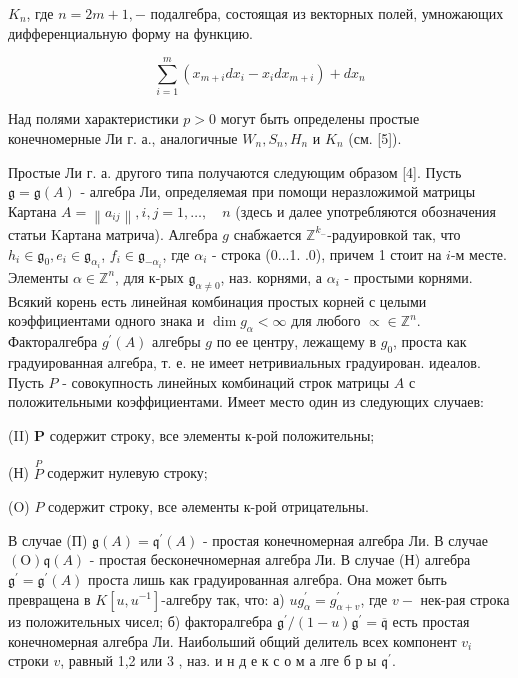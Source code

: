 \documentclass[10pt]{article}
\begin{document}
$K_{n}$, где $n=2 m+1,-$ подалгебра, состоящая из векторных полей, умножающих дифференциальную форму на функцию.



\[

\sum_{i=1}^{m}\left(x_{m+i} d x_{i}-x_{i} d x_{m+i}\right)+d x_{n}

\]



Над полями характеристики $p>0$ могут быть определены простые конечномерные Ли г. а., аналогичные $W_{n}, S_{n}, H_{n}$ и $K_{n}$ (см. [5]).



Простые Ли г. а. другого типа получаются следующим образом [4]. Пусть $\mathfrak{g}=\mathfrak{g}(A)$ - алгебра Ли, определяемая при помощи неразложимой матрицы Картана $A=\left\|a_{i j}\right\|, i, j=1, \ldots, \quad n$ (здесь и далее употребляются обозначения статьи Kартана матрича). Алгебра $g$ снабжается $\mathbb{Z}^{k_{-}}$-радуировкой так, что $h_{i} \in \mathfrak{g}_{0}, e_{i} \in \mathfrak{g}_{\alpha_{i}}$, $f_{i} \in \mathfrak{g}_{-\alpha_{i}}$, где $\alpha_{i}$ - строка (0...1. .0), причем 1 стоит на $i$-м месте. Элементы $\alpha \in \mathbb{Z}^{n}$, для к-рых $\mathfrak{g}_{\alpha \neq 0}$, наз. корнями, а $\alpha_{i}$ - простыми корнями. Всякий корень есть линейная комбинация простых корней с целыми коэффициентами одного знака и $\operatorname{dim} g_{\alpha}<\infty$ для любого $\propto \in \mathbb{Z}^{n}$. Факторалгебра $g^{\prime}(A)$ алгебры $g$ по ее центру, лежащему в $g_{0}$, проста как градуированная алгебра, т. е. не имеет нетривиальных градуирован. идеалов. Пусть $P$ - совокупность линейных комбинаций строк матрицы $A$ с положительными коэффициентами. Имеет место один из следующих случаев:



(II) $\boldsymbol{P}$ содержит строку, все элементы к-рой положительны;



(Н) $\stackrel{P}{P}$ содержит нулевую строку;



(O) $P$ содержит строку, все әлементы к-рой отрицательны.



В случае (П) $\mathfrak{g}(A)=\mathfrak{q}^{\prime}(A)$ - простая конечномерная алгебра Ли. В случае $(\mathrm{O}) \mathfrak{q}(A)$ - простая бесконечномерная алгебра Ли. В случае (Н) алгебра $\mathfrak{g}^{\prime}=\mathfrak{g}^{\prime}(A)$ проста лишь как градуированная алгебра. Она может быть превращена в $K\left[u, u^{-1}\right]$-алгебру так, что: а) $u g_{\alpha}^{\prime}=g_{\alpha+v}^{\prime}$, где $v-$ нек-рая строка из положительных чисел; б) факторалгебра $\mathfrak{g}^{\prime} /(1-u) \mathfrak{g}^{\prime}=\overline{\mathfrak{q}}$ есть простая конечномерная алгебра Ли. Наибольший общий делитель всех компонент $v_{i}$ строки $v$, равный 1,2 или 3 , наз. и н д е к с о м а лге б р ы $\mathfrak{q}^{\prime}$.
\end{document}
